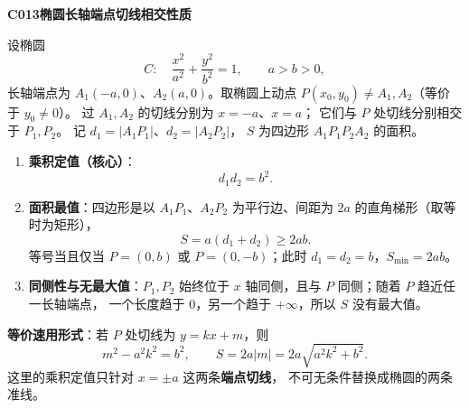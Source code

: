\begin{statementbox}
\textbf{C013\quad 椭圆长轴端点切线相交性质}

设椭圆
\[
C:\quad \frac{x^2}{a^2}+\frac{y^2}{b^2}=1,\qquad a>b>0,
\]
长轴端点为 $A_1(-a,0)$、$A_2(a,0)$。取椭圆上动点
$P(x_0,y_0)\ne A_1,A_2$（等价于 $y_0\ne0$）。
过 $A_1,A_2$ 的切线分别为 $x=-a$、$x=a$；
它们与 $P$ 处切线分别相交于 $P_1,P_2$。
记 $d_1=|A_1P_1|$、$d_2=|A_2P_2|$，
$S$ 为四边形 $A_1P_1P_2A_2$ 的面积。

\begin{enumerate}
  \item \textbf{乘积定值（核心）}：
  \[
  \boxed{d_1d_2=b^2.}
  \]
  \item \textbf{面积最值}：四边形是以 $A_1P_1$、$A_2P_2$
  为平行边、间距为 $2a$ 的直角梯形（取等时为矩形），
  \[
  \boxed{S=a(d_1+d_2)\ge 2ab.}
  \]
  等号当且仅当 $P=(0,b)$ 或 $P=(0,-b)$；此时
  $d_1=d_2=b$，$S_{\min}=2ab$。
  \item \textbf{同侧性与无最大值}：$P_1,P_2$ 始终位于
  $x$ 轴同侧，且与 $P$ 同侧；随着 $P$ 趋近任一长轴端点，
  一个长度趋于 $0$，另一个趋于 $+\infty$，所以 $S$ 没有最大值。
\end{enumerate}

\textbf{等价速用形式}：若 $P$ 处切线为 $y=kx+m$，则
\[
\boxed{m^2-a^2k^2=b^2},\qquad
\boxed{S=2a|m|=2a\sqrt{a^2k^2+b^2}}.
\]
这里的乘积定值只针对 $x=\pm a$ 这两条\textbf{端点切线}，
不可无条件替换成椭圆的两条准线。
\end{statementbox}
